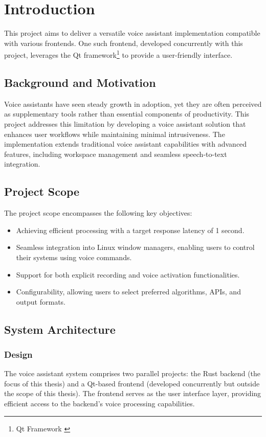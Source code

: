 \renewcommand*\chapterpagestyle{scrheadings}
\chapter{Introduction}

This project aims to deliver a versatile voice assistant implementation
compatible with various frontends. One such frontend,
developed concurrently with this project,
leverages the Qt framework\footnote{Qt Framework \cite{qt}}
to provide a user-friendly interface.

\section{Background and Motivation}
Voice assistants have seen steady growth in adoption,
yet they are often perceived as supplementary tools
rather than essential components of productivity.
This project addresses this limitation by developing a voice assistant solution
that enhances user workflows while maintaining minimal intrusiveness.
The implementation extends traditional voice assistant capabilities
with advanced features, including workspace management and seamless speech-to-text integration.

\section{Project Scope}
The project scope encompasses the following key objectives:
\begin{itemize}
    \item Achieving efficient processing with a target response latency of 1 second.
    \item Seamless integration into Linux window managers, enabling users to control their systems using voice commands.
    \item Support for both explicit recording and voice activation functionalities.
    \item Configurability, allowing users to select preferred algorithms, APIs, and output formats.
\end{itemize}

\section{System Architecture}

\subsection{Design}
\label{sec:design}
The voice assistant system comprises two parallel projects:
the Rust backend (the focus of this thesis) and a Qt-based frontend
(developed concurrently but outside the scope of this thesis).
The frontend serves as the user interface layer,
providing efficient access to the backend's voice processing capabilities.

